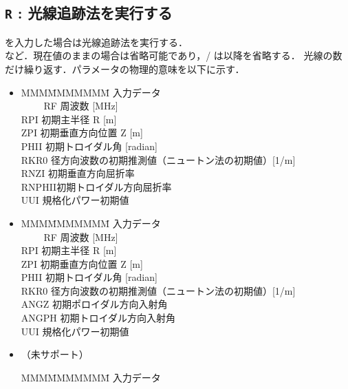 \documentclass[11pt]{jarticle}
\begin{document}
\subsection{{\tt R} : 光線追跡法を実行する}

 を入力した場合は光線追跡法を実行する．
\\

など．現在値のままの場合は省略可能であり，/ は以降を省略する．
光線の数だけ繰り返す．パラメータの物理的意味を以下に示す．
\begin{itemize}
\item
{}
   \begin{tabbing}
MMM\=MMMMMMM\=\kill
入力データ\\
　　  \> RF    \>周波数 [MHz] \\
      \> RPI   \>初期主半径 R [m] \\
      \> ZPI   \>初期垂直方向位置 Z [m]\\
      \> PHII  \>初期トロイダル角 [radian]\\
      \> RKR0  \>径方向波数の初期推測値（ニュートン法の初期値）[1/m] \\
      \> RNZI  \>初期垂直方向屈折率 \\
      \> RNPHII\>初期トロイダル方向屈折率\\
      \> UUI   \>規格化パワー初期値\\
\end{tabbing}   
\item
{}
   \begin{tabbing}
MMM\=MMMMMMM\=\kill
入力データ\\
　　  \> RF    \>周波数 [MHz] \\
      \> RPI   \>初期主半径 R [m] \\
      \> ZPI   \>初期垂直方向位置 Z [m]\\
      \> PHII  \>初期トロイダル角 [radian]\\
      \> RKR0  \>径方向波数の初期推測値（ニュートン法の初期値）[1/m] \\
      \> ANGZ  \>初期ポロイダル方向入射角 \\
      \> ANGPH \>初期トロイダル方向入射角\\
      \> UUI   \>規格化パワー初期値\\
\end{tabbing}   
\item
{}（未サポート）
   \begin{tabbing}
MMM\=MMMMMMM\=\kill
入力データ\\

\end{tabbing}
\end{itemize}
\end{document}

